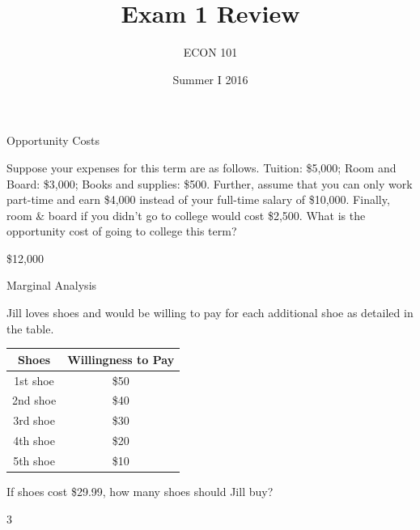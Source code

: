 \documentclass[pdf, handout]{beamer}
\title{Exam 1 Review}
\author[David A. D\'iaz \hspace{20mm} UNC Chapel Hill]{ECON 101}
\date{Summer I 2016}
\begin{document}
 
	
\begin{frame}
		
		\titlepage
		
\end{frame}
	
	
\begin{frame}{Opportunity Costs}
	

Suppose your expenses for this term are as follows. Tuition: \$5,000; Room and Board: \$3,000; Books and supplies: \$500. Further, assume that you can only work part-time and earn \$4,000 instead of your full-time salary of \$10,000. Finally, room \& board if you didn't go to college would cost \$2,500. What is the opportunity cost of going to college this term?
\vspace{1.5cm}
\\

\pause
\begin{flushright} \color{red}\large{\$12,000} \end{flushright}

\end{frame}
	
\begin{frame}{Marginal Analysis}
	
Jill loves shoes and would be willing to pay for each additional shoe as detailed in the table.

\begin{table}
	\begin{tabular}{c| c  }
		Shoes & Willingness to Pay  \\
		\hline
		1st shoe & \$50 \\ 
		2nd shoe & \$40\\
		3rd shoe & \$30\\
		4th shoe & \$20 \\
		5th shoe & \$10
	\end{tabular}
\end{table}

If shoes cost \$29.99, how many shoes should Jill buy?

\pause

\begin{flushright}
	\color{red}
	\large{3}
\end{flushright}	
\end{frame}
\end{document}
